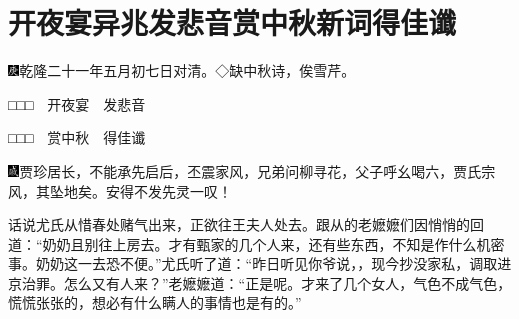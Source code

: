 
\chapter{开夜宴异兆发悲音\hspace{.5em}赏中秋新词得佳谶}
{\includegraphics[width=3mm]{../Images/00004}\kaishu 乾隆二十一年五月初七日对清。◇缺中秋诗，俟雪芹。}

{\kaishu □□□　开夜宴　发悲音}

{\kaishu □□□　赏中秋　得佳谶}

{\includegraphics[width=3mm]{../Images/00005}\kaishu 贾珍居长，不能承先启后，丕震家风，兄弟问柳寻花，父子呼幺喝六，贾氏宗风，其坠地矣。安得不发先灵一叹！}

话说尤氏从惜春处赌气出来，正欲往王夫人处去。跟从的老嬷嬷们因悄悄的回道：``奶奶且别往上房去。才有甄家的几个人来，还有些东西，不知是作什么机密事。奶奶这一去恐不便。''尤氏听了道：``昨日听见你爷说，，现今抄没家私，调取进京治罪。怎么又有人来？''老嬷嬷道：``正是呢。才来了几个女人，气色不成气色，慌慌张张的，想必有什么瞒人的事情也是有的。''


